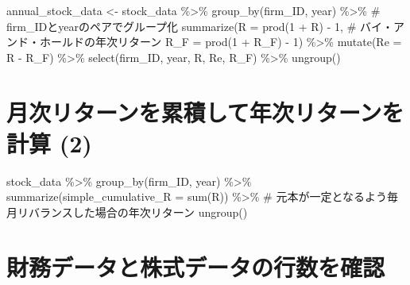 \documentclass[
  letterpaper,
  DIV=11,
  numbers=noendperiod]{scrreprt}
\newenvironment{Shaded}{\begin{snugshade}}{\end{snugshade}}
\newcommand{\AttributeTok}[1]{\textcolor[rgb]{0.40,0.45,0.13}{#1}}
\newcommand{\CommentTok}[1]{\textcolor[rgb]{0.37,0.37,0.37}{#1}}
\newcommand{\DecValTok}[1]{\textcolor[rgb]{0.68,0.00,0.00}{#1}}
\newcommand{\FunctionTok}[1]{\textcolor[rgb]{0.28,0.35,0.67}{#1}}
\newcommand{\NormalTok}[1]{\textcolor[rgb]{0.00,0.23,0.31}{#1}}
\newcommand{\OtherTok}[1]{\textcolor[rgb]{0.00,0.23,0.31}{#1}}
\newcommand{\SpecialCharTok}[1]{\textcolor[rgb]{0.37,0.37,0.37}{#1}}
\begin{document}
\begin{Shaded}
\begin{Highlighting}[]
\NormalTok{annual\_stock\_data }\OtherTok{\textless{}{-}}\NormalTok{ stock\_data }\SpecialCharTok{\%\textgreater{}\%} 
  \FunctionTok{group\_by}\NormalTok{(firm\_ID, year) }\SpecialCharTok{\%\textgreater{}\%} \CommentTok{\# firm\_IDとyearのペアでグループ化}
  \FunctionTok{summarize}\NormalTok{(}\AttributeTok{R =} \FunctionTok{prod}\NormalTok{(}\DecValTok{1} \SpecialCharTok{+}\NormalTok{ R) }\SpecialCharTok{{-}} \DecValTok{1}\NormalTok{, }\CommentTok{\# バイ・アンド・ホールドの年次リターン}
            \AttributeTok{R\_F =} \FunctionTok{prod}\NormalTok{(}\DecValTok{1} \SpecialCharTok{+}\NormalTok{ R\_F) }\SpecialCharTok{{-}} \DecValTok{1}\NormalTok{) }\SpecialCharTok{\%\textgreater{}\%}
  \FunctionTok{mutate}\NormalTok{(}\AttributeTok{Re =}\NormalTok{ R }\SpecialCharTok{{-}}\NormalTok{ R\_F) }\SpecialCharTok{\%\textgreater{}\%}
  \FunctionTok{select}\NormalTok{(firm\_ID, year, R, Re, R\_F) }\SpecialCharTok{\%\textgreater{}\%}
  \FunctionTok{ungroup}\NormalTok{()}
\end{Highlighting}
\end{Shaded}

\section{月次リターンを累積して年次リターンを計算
(2)}\label{ux6708ux6b21ux30eaux30bfux30fcux30f3ux3092ux7d2fux7a4dux3057ux3066ux5e74ux6b21ux30eaux30bfux30fcux30f3ux3092ux8a08ux7b97-2}

\begin{Shaded}
\begin{Highlighting}[]
\NormalTok{stock\_data }\SpecialCharTok{\%\textgreater{}\%} 
  \FunctionTok{group\_by}\NormalTok{(firm\_ID, year) }\SpecialCharTok{\%\textgreater{}\%} 
  \FunctionTok{summarize}\NormalTok{(}\AttributeTok{simple\_cumulative\_R =} \FunctionTok{sum}\NormalTok{(R)) }\SpecialCharTok{\%\textgreater{}\%} \CommentTok{\# 元本が一定となるよう毎月リバランスした場合の年次リターン}
  \FunctionTok{ungroup}\NormalTok{()}
\end{Highlighting}
\end{Shaded}

\section{財務データと株式データの行数を確認}\label{ux8ca1ux52d9ux30c7ux30fcux30bfux3068ux682aux5f0fux30c7ux30fcux30bfux306eux884cux6570ux3092ux78baux8a8d}
\end{document}
